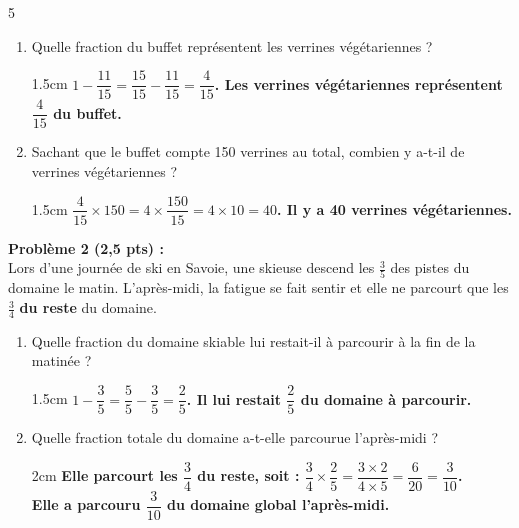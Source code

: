 \documentclass[a4paper]{book}
\begin{document}
{\begin{exerciceNote}{5}
\begin{enumerate}
            \item Quelle fraction du buffet représentent les verrines végétariennes ? 
            \begin{ZoneReponse}{1.5cm}
                \color{red}\bfseries
                $1 - \dfrac{11}{15} = \dfrac{15}{15} - \dfrac{11}{15} = \dfrac{4}{15}$. Les verrines végétariennes représentent $\dfrac{4}{15}$ du buffet.
            \end{ZoneReponse}
            
            \item Sachant que le buffet compte 150 verrines au total, combien y a-t-il de verrines végétariennes ?
            \begin{ZoneReponse}{1.5cm}
                \color{red}\bfseries
                $\dfrac{4}{15} \times 150 = 4 \times \dfrac{150}{15} = 4 \times 10 = 40$. Il y a 40 verrines végétariennes.
            \end{ZoneReponse}
        \end{enumerate}
    
        \medskip
        
        \textbf{Problème 2 (2,5 pts) :}\\
        Lors d'une journée de ski en Savoie, une skieuse descend les $\frac{3}{5}$ des pistes du domaine le matin. L'après-midi, la fatigue se fait sentir et elle ne parcourt que les $\frac{3}{4}$ \textbf{du reste} du domaine.
        \begin{enumerate}
            \item Quelle fraction du domaine skiable lui restait-il à parcourir à la fin de la matinée ? 
            \begin{ZoneReponse}{1.5cm}
                \color{red}\bfseries
                $1 - \dfrac{3}{5} = \dfrac{5}{5} - \dfrac{3}{5} = \dfrac{2}{5}$. Il lui restait $\dfrac{2}{5}$ du domaine à parcourir.
            \end{ZoneReponse}
            
            \item Quelle fraction totale du domaine a-t-elle parcourue l'après-midi ? 
            \begin{ZoneReponse}{2cm}
                \color{red}\bfseries
                Elle parcourt les $\dfrac{3}{4}$ du reste, soit : $\dfrac{3}{4} \times \dfrac{2}{5} = \dfrac{3 \times 2}{4 \times 5} = \dfrac{6}{20} = \dfrac{3}{10}$.\\
                Elle a parcouru $\dfrac{3}{10}$ du domaine global l'après-midi.
            \end{ZoneReponse}
            

\end{enumerate}
\end{exerciceNote}}
\end{document}
